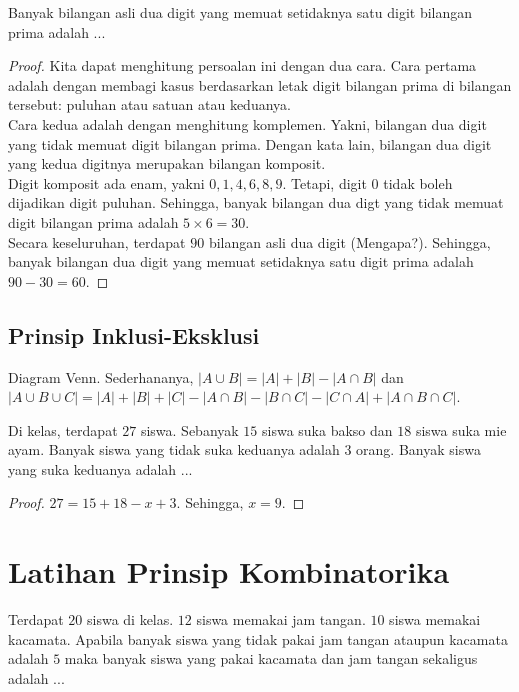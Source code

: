 \documentclass[11pt]{scrartcl}
\begin{document}
\begin{example}
    Banyak bilangan asli dua digit yang memuat setidaknya satu digit bilangan prima adalah ...
\end{example}

\begin{proof}
    Kita dapat menghitung persoalan ini dengan dua cara. Cara pertama adalah dengan membagi kasus berdasarkan letak digit bilangan prima di bilangan tersebut: puluhan atau satuan atau keduanya. \\
    Cara kedua adalah dengan menghitung komplemen. Yakni, bilangan dua digit yang tidak memuat digit bilangan prima. Dengan kata lain, bilangan dua digit yang kedua digitnya merupakan bilangan komposit. \\
    Digit komposit ada enam, yakni $0, 1, 4, 6, 8, 9$. Tetapi, digit $0$ tidak boleh dijadikan digit puluhan. Sehingga, banyak bilangan dua digt yang tidak memuat digit bilangan prima adalah $5 \times 6 = 30$.\\
    Secara keseluruhan, terdapat $90$ bilangan asli dua digit (Mengapa?). Sehingga, banyak bilangan dua digit yang memuat setidaknya satu digit prima adalah $90 - 30 = 60$.
\end{proof}

\subsection{Prinsip Inklusi-Eksklusi}
Diagram Venn. Sederhananya, $|A \cup B| = |A| + |B| - |A \cap B|$ dan $|A \cup B \cup C| = |A| + |B| + |C| - |A \cap B| - |B \cap C| - |C \cap A| + |A \cap B \cap C|$.

\begin{example}
    Di kelas, terdapat $27$ siswa. Sebanyak $15$ siswa suka bakso dan $18$ siswa suka mie ayam. Banyak siswa yang tidak suka keduanya adalah $3$ orang. Banyak siswa yang suka keduanya adalah ...
\end{example}

\begin{proof}
    $27 = 15 + 18 - x + 3$. Sehingga, $x = 9$. 
\end{proof}

\section{Latihan Prinsip Kombinatorika}

\begin{problem}
    Terdapat $20$ siswa di kelas. $12$ siswa memakai jam tangan. $10$ siswa memakai kacamata. Apabila banyak siswa yang tidak pakai jam tangan ataupun kacamata adalah $5$ maka banyak siswa yang pakai kacamata dan jam tangan sekaligus adalah ...
\end{problem}
\end{document}
